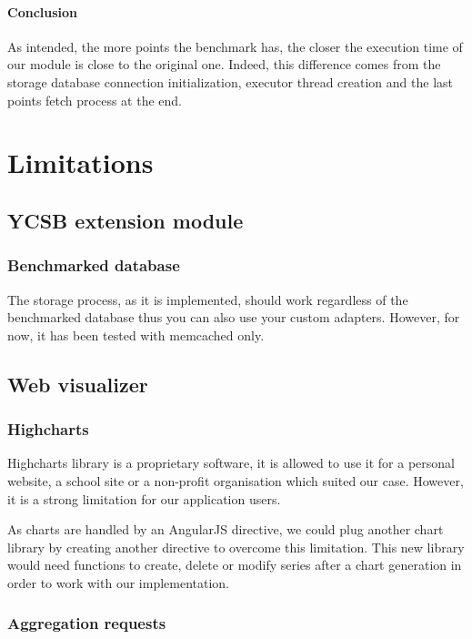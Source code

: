 \documentclass[a4paper,11pt]{report}
\begin{document}
\paragraph{Conclusion}

As intended, the more points the benchmark has, the closer the execution time of our module is close to the original one. Indeed, this difference comes from the storage database connection initialization, executor thread creation and the last points fetch process at the end.

\clearpage

\section{Limitations}

\subsection{YCSB extension module}

\subsubsection{Benchmarked database}

The storage process, as it is implemented, should work regardless of the benchmarked database thus you can also use your custom adapters.
However, for now, it has been tested with memcached only.

\subsection{Web visualizer}

\subsubsection{Highcharts}

Highcharts library is a proprietary software, it is allowed to use it for a personal website, a school site or a non-profit organisation which suited our case. However, it is a strong limitation for our application users. 

As charts are handled by an AngularJS directive, we could plug another chart library by creating another directive to overcome this limitation. This new library would need functions to create, delete or modify series after a chart generation in order to work with our implementation.

\subsubsection{Aggregation requests}
\end{document}
